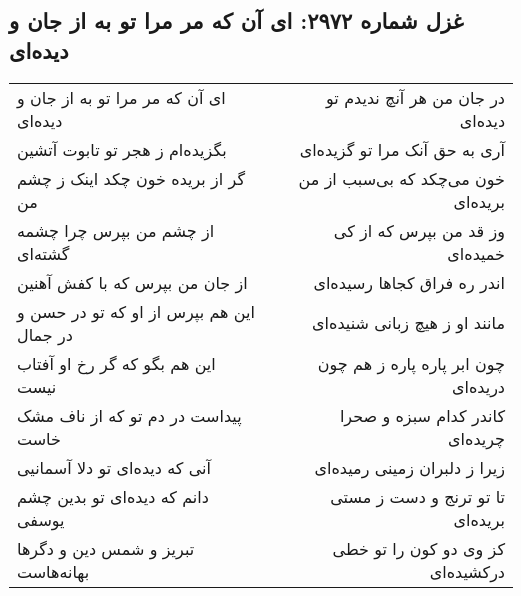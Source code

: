 \begin{center}
\section*{غزل شماره ۲۹۷۲: ای آن که مر مرا تو به از جان و دیده‌ای}
\label{sec:2972}
\begin{longtable}{l p{0.5cm} r}
ای آن که مر مرا تو به از جان و دیده‌ای
&&
در جان من هر آنچ ندیدم تو دیده‌ای
\\
بگزیده‌ام ز هجر تو تابوت آتشین
&&
آری به حق آنک مرا تو گزیده‌ای
\\
گر از بریده خون چکد اینک ز چشم من
&&
خون می‌چکد که بی‌سبب از من بریده‌ای
\\
از چشم من بپرس چرا چشمه گشته‌ای
&&
وز قد من بپرس که از کی خمیده‌ای
\\
از جان من بپرس که با کفش آهنین
&&
اندر ره فراق کجاها رسیده‌ای
\\
این هم بپرس از او که تو در حسن و در جمال
&&
مانند او ز هیچ زبانی شنیده‌ای
\\
این هم بگو که گر رخ او آفتاب نیست
&&
چون ابر پاره پاره ز هم چون دریده‌ای
\\
پیداست در دم تو که از ناف مشک خاست
&&
کاندر کدام سبزه و صحرا چریده‌ای
\\
آنی که دیده‌ای تو دلا آسمانیی
&&
زیرا ز دلبران زمینی رمیده‌ای
\\
دانم که دیده‌ای تو بدین چشم یوسفی
&&
تا تو ترنج و دست ز مستی بریده‌ای
\\
تبریز و شمس دین و دگرها بهانه‌هاست
&&
کز وی دو کون را تو خطی درکشیده‌ای
\\
\end{longtable}
\end{center}

